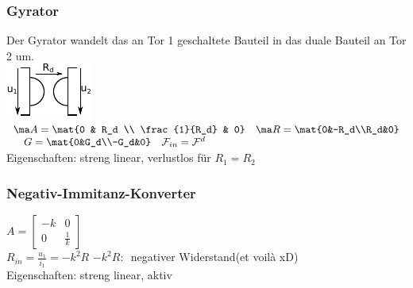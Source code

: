 \documentclass[fs, footer]{latex4ei}
\begin{document}
\begin{multicols*}{4}
    \subsubsection{Gyrator}
    Der Gyrator wandelt das an Tor 1 geschaltete Bauteil in das duale Bauteil an Tor 2 um.\\
    \includegraphics[scale=.8]{./img/symb/symb_gyrator.pdf}
    $\begin{array}{l}
            \ma A=\mat{0 & R_d \\ \frac{1}{R_d} & 0}\mathrm{\quad}\ma R = \mat{0&-R_d\\R_d&0}\\ \mathrm{\quad} G = \mat{0&G_d\\-G_d&0}\mathrm{\quad}\mathcal F_{in}=\mathcal F^d
        \end{array}$\\
    Eigenschaften: streng linear, verlustlos für $R_1=R_2$\\

    \subsubsection{Negativ-Immitanz-Konverter}
    $A=\begin{bmatrix} -k & 0 \\ 0 & \frac{1}{k} \end{bmatrix}$\\
    $R_{in}=\frac{u_1}{i_1}=-k^2R$ \quad $-k^2 R:$\ negativer Widerstand(et voilà xD)\\
    Eigenschaften: streng linear, aktiv

    \sectionbox{
}
\end{multicols*}
\end{document}
